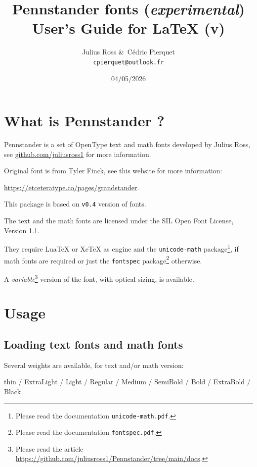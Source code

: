 \documentclass[a4paper]{scrartcl}
\date{04/05/2026}
\title{Pennstander fonts (\textit{experimental}) \\User’s Guide for LaTeX (v\version)}
\author{Julius Ross \&\ Cédric Pierquet \\ \texttt{cpierquet@outlook.fr}}
\newcommand*{\pkg}[1]{\texttt{#1}}
\newcommand*{\file}[1]{\texttt{#1}}
\newcommand*{\version}{0.4}
\begin{document}
\maketitle

\bigskip

\section{What is Pennstander ?}

Pennstander is a set of OpenType text and math fonts developed by Julius Ross, see \url{github.com/juliusross1} for more information.


Original font is from Tyler Finck, see this website for more information:

\url{https://etceteratype.co/pages/grandstander}.

\smallskip

This package is based on \texttt{v\version} version of fonts.

The text and the math fonts are licensed under the SIL Open Font License, Version 1.1.

They require LuaTeX or XeTeX as engine and the \pkg{unicode-math} package\footnote{Please read the documentation \file{unicode-math.pdf}.}, if math fonts are required or just the \pkg{fontspec} package\footnote{Please read the documentation \file{fontspec.pdf}.} otherwise.

\smallskip

A \textit{variable}\footnote{Please read the article \url{https://github.com/juliusross1/Pennstander/tree/main/docs}.} version of the font, with optical sizing, is available.

\pagebreak

\section{Usage}

\subsection{Loading text fonts and math fonts}

Several weights are available, for text and/or math version:

{\small \hfill{\pennstanderthin thin} / {\pennstanderextralight ExtraLight} / {\pennstanderlight Light} / {\pennstander Regular} / {\pennstandermedium Medium} / {\pennstandersemibold SemiBold} / {\pennstanderbold Bold} / {\pennstanderextrabold ExtraBold} / {\pennstanderblack Black}\hfill\null}
\end{document}
